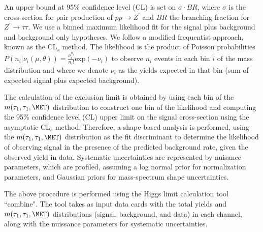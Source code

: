 \fi



An upper bound at 95\% confidence level (CL) is set on $\sigma \cdot BR$, 
where $\sigma$ is the cross-section for pair production of $pp\to Z^{\prime}$ and $BR$ the branching fraction for $Z^{\prime}\to\tau\tau$. We use a binned maximum 
likelihood fit for the signal plus background and background only hypotheses. We follow a modified frequentist approach, known as the CL$_{s}$ method. The 
likelihood is the product of Poisson probabilities 
$P(n_{i}|\nu_{i}(\mu,\theta)) = \frac{\nu_{i}^{n_{i}}}{n_{i}!}$exp$(-\nu_{i})$
to observe $n_{i}$ events in each bin $i$ of the mass distribution and where we denote $\nu_{i}$ as the yields expected in that bin (sum of expected signal plus 
expected background).

The calculation of the exclusion limit is obtained by using each bin of the $m(\tau_{1},\tau_{1},\MET)$ distribution to construct one bin of the likelihood 
and computing the 95\% confidence level (CL) upper limit on the signal cross-section using the asymptotic CL$_{s}$ method. 
Therefore, a shape based analysis is performed, using the $m(\tau_{1},\tau_{1},\MET)$ distribution as the fit discriminant to determine the 
likelihood of observing signal in the presence of the predicted background rate, given the observed yield in data. Systematic uncertainties are represented by nuisance parameters, which are profiled, assuming a log normal prior for normalization parameters, and Gaussian priors for mass-spectrum shape uncertainties.

The above procedure is performed using the Higgs limit calculation tool ``combine". The tool takes as input data cards with the total yields and $m(\tau_{1},\tau_{1},\MET)$ distributions (signal, 
background, and data) in each channel, along with the nuissance parameters for systematic uncertainties. 

